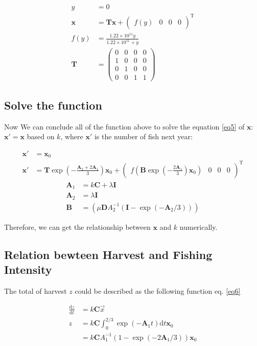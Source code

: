 \documentclass{IEEEtran}
\begin{document}
\begin{align}
    \label{eq4}
    y &= 0\\
    \bm x &= \mathbf T \bm x +\begin{pmatrix} f(y)&0&0&0\end{pmatrix}^{\mathrm T}\\
    f(y) &= \frac{1.22\times 10 ^{11}y}{1.22\times 10 ^{11} + y}\\
    \mathbf T &= \begin{pmatrix} 0 & 0 & 0 & 0 \\ 1& 0 & 0 & 0 \\ 0 & 1 & 0 & 0 \\0 & 0 & 1 & 1 \end{pmatrix}
\end{align}

\subsection{Solve the function}

Now We can conclude all of the function above to solve the equation \ref{eq5} of $\bm x$: $\bm x' = \bm x$ based on $k$, where $\bm x'$ is the number of fish next year:  

\begin{align}
    \bm x' &= \bm x_0\\
    \label{eq5}
    \bm x' &= \mathbf T \exp(-\frac{\mathbf A_2 + 2 \mathbf A_1}{3})\bm x_0 +\begin{pmatrix} f(\mathbf B \exp(-\frac{2\mathbf A_1}{3})\bm x_0)&0&0&0\end{pmatrix}^{\mathrm T}
\end{align}
\begin{align}
    \mathbf A_1 &= k\mathbf C + \lambda \mathbf I\\
    \mathbf A_2 &= \lambda \mathbf I\\
    \mathbf B &= (\mu \mathbf D A_2^{-1}(\mathbf I - \exp(-\mathbf A_2/3)))
\end{align}

Therefore, we can get the relationship between $\bm x$ and $k$ numerically.
\subsection{Relation bewteen Harvest and Fishing Intensity}
The total of harvest $z$ could be described as the following function eq. \ref{eq6}

\begin{align}
    \label{eq6}
    \frac {\mathrm dz}{\mathrm dt} &= k\mathbf C \vec x\\
    z &= k\mathbf C\int_0^{2/3}\exp(-\mathbf A_1t)\mathrm dt\bm x_0 \\ 
    &= k\mathbf C  A_1^{-1} (1-\exp(-2\mathbf A_1/3))\bm x_0
\end{align}
\end{document}
